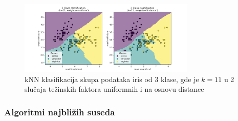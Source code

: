 \documentclass[fontsize=12bp, paper=a4]{scrarticle}
\begin{document}
\begin{figure}[h!]
    \centering
    \includegraphics[width=0.75\textwidth]{image-22.png}
    \caption{\centering kNN klasifikacija skupa podataka iris od 3 klase, gde je $k=11$ u 2 slučaja težinskih faktora uniformnih i na osnovu distance}
\end{figure}

\subsubsection{Algoritmi najbližih suseda}
\end{document}
